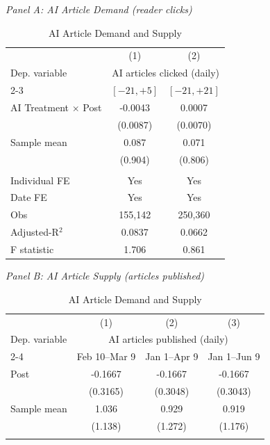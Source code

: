  \begin{table}[H]
 \centering
 \caption{AI Article Demand and Supply}
 \label{tab:ai_combined}
 \par\smallskip\noindent\textit{Panel A: AI Article Demand (reader clicks)}\\
\def\sym#1{\ifmmode^{#1}\else\(^{#1}\)\fi}
\begin{tabular}{l*{2}{c}}
\toprule
 & (1) & (2) \\
\multicolumn{1}{l}{Dep. variable} & \multicolumn{2}{c}{AI articles clicked (daily)} \\
\cmidrule(lr){2-3}
\multicolumn{1}{c}{Window} & $[-21, +5]$ & $[-21, +21]$ \\
\midrule
\addlinespace
AI Treatment $\times$ Post&  -0.0043   &   0.0007   \\
                & (0.0087)   & (0.0070)   \\
\addlinespace
Sample mean &      0.087 &      0.071 \\
 & (0.904) & (0.806) \\
& & \\
Individual FE & Yes & Yes \\
Date FE & Yes & Yes \\
\midrule
Obs &    155,142 &    250,360 \\
Adjusted-R$^2$ &     0.0837 &     0.0662 \\
F statistic &      1.706 &      0.861 \\
\bottomrule
\end{tabular}
 \par\medskip\noindent\textit{Panel B: AI Article Supply (articles published)}\\
\def\sym#1{\ifmmode^{#1}\else\(^{#1}\)\fi}
\begin{tabular}{l*{3}{c}}
\toprule
 & (1) & (2) & (3) \\
\multicolumn{1}{l}{Dep. variable} & \multicolumn{3}{c}{AI articles published (daily)} \\
\cmidrule(lr){2-4}
\multicolumn{1}{c}{Window} & Feb 10--Mar 9 & Jan 1--Apr 9 & Jan 1--Jun 9 \\
\midrule
\addlinespace
Post            &  -0.1667   &  -0.1667   &  -0.1667   \\
                & (0.3165)   & (0.3048)   & (0.3043)   \\
\addlinespace
Sample mean &      1.036 &      0.929 &      0.919 \\
 & (1.138) & (1.272) & (1.176) \\
& & & \\

\end{tabular}
\end{table}
